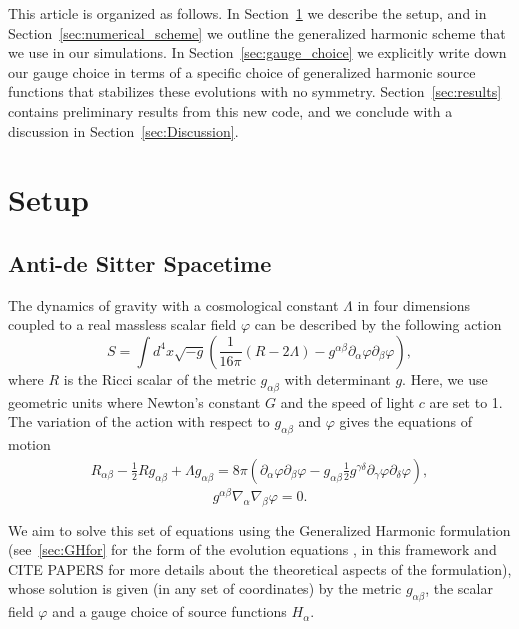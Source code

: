 \documentclass[12pt]{iopart} %
\begin{document}
This article is organized as follows. 
In Section~\ref{sec:setup} we describe the setup, and in Section~\ref{sec:numerical_scheme} we outline the generalized harmonic scheme that we use in our simulations.
In Section~\ref{sec:gauge_choice} we explicitly write down our gauge choice in terms of a specific choice of generalized harmonic source functions that stabilizes these evolutions with no symmetry.
Section~\ref{sec:results} contains preliminary results from this new code, and we conclude with a discussion in Section~\ref{sec:Discussion}.



\section{Setup}\label{sec:setup}

\subsection{Anti-de Sitter Spacetime}\label{subsec:AdS}
The dynamics of gravity with a cosmological constant $\Lambda$ in four dimensions coupled to a real massless scalar field $\varphi$ can be described by the following action
\begin{equation}\label{eqn:action}
S = \int d^4 x \sqrt{-g} \left( \frac{1}{16\pi} \left( R - 2\Lambda \right) - g^{\alpha\beta} \partial_\alpha \varphi \partial_\beta \varphi \right),
\end{equation}
where $R$ is the Ricci scalar of the metric $g_{\alpha\beta}$ with determinant $g$.
Here, we use geometric units where Newton's constant $G$ and the speed of light $c$ are set to 1.
The variation of the action  with respect to $g_{\alpha\beta}$ and $\varphi$ gives the equations of motion
\begin{eqnarray}\label{eqn:eoms1}
R_{\alpha\beta} - \frac{1}{2} R g_{\alpha\beta} + \Lambda g_{\alpha\beta} = 8\pi \left( \partial_\alpha \varphi \partial_\beta \varphi - g_{\alpha\beta} \frac{1}{2} g^{\gamma\delta} \partial_{\gamma} \varphi \partial_{\delta} \varphi \right),
\end{eqnarray}
\begin{equation}\label{eqn:eoms2}
g^{\alpha\beta} \nabla_{\alpha} \nabla_{\beta} \varphi = 0.
\end{equation}

We aim to solve this set of equations using the Generalized Harmonic formulation (see~\ref{sec:GHfor} for the form of the evolution equations , in this framework and CITE PAPERS for more details about the theoretical aspects of the formulation), whose solution is given (in any set of coordinates) by the metric $g_{\alpha\beta}$, the scalar field $\varphi$ and a gauge choice of source functions $H_\alpha$. 
\end{document}
